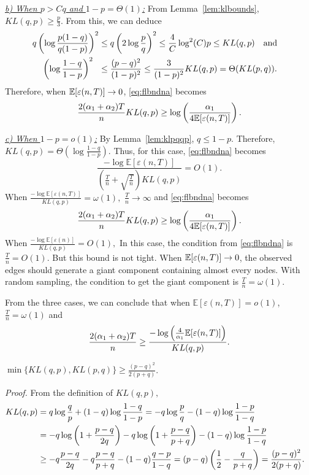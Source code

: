 \smallskip
\noindent\underline{\em \underline b)  When $p >Cq$ and
  $1-p=\Theta(1)$:} From Lemma~\ref{lem:klbounds}, $KL(q,p) \ge
\frac{p}{3}.$ From this, we can deduce
\begin{align}q \left(\log\frac{p(1-q)}{q(1-p)}\right)^2 &\le q \left(2\log\frac{p}{q}\right)^2 \le \frac{4}{C} \log^2(C)
p \le  KL(q,p) \quad \mbox{and} \cr \left( \log\frac{1-q}{1-p}\right)^2 ~~ &\le \frac{(p-q)^2}{(1-p)^2}
\le \frac{3}{(1-p)^2}KL(q,p) = \Theta(KL(p,q) ).\end{align} 
Therefore, when ${\mathbb E}[\varepsilon(n,T)]\rightarrow 0$, \eqref{eq:flbndna} becomes
$$ \frac{2(\alpha_1 + \alpha_2)T}{n}KL(q,p) \ge  \log \left(
  \frac{\alpha_1}{4 {\mathbb E} [ \varepsilon(n,T) ]} \right).$$

\smallskip
\noindent\underline{\em c) When $1-p = o(1)$:} By
Lemma~\ref{lem:klpqqp}, $q \le 1-p$. Therefore, $KL(q,p) = \Theta
(\log\frac{1-q}{1-p}).$ Thus, for this case, \eqref{eq:flbndna} becomes
$$\frac{-\log \mathbb{E}[\varepsilon (n,T)]}{ (\frac{T}{n} +
  \sqrt{\frac{T}{n}} ) KL(q,p)} = O(1). $$
When $\frac{-\log \mathbb{E}[\varepsilon (n,T)]}{ KL(q,p)} = \omega(1),$
$\frac{T}{n} \to \infty$ and \eqref{eq:flbndna} becomes
$$ \frac{2(\alpha_1 + \alpha_2 )T}{n}KL(q,p) \ge  \log \left(
  \frac{\alpha_1}{4 {\mathbb E} [ \varepsilon(n,T) ]} \right).$$
When $\frac{-\log \mathbb{E}[\varepsilon (n)]}{ KL(q,p)} = O(1),$
In this case, the condition from
\eqref{eq:flbndna} is $\frac{T}{n} = O(1).$ But this bound is not
tight. When ${\mathbb E}[\varepsilon(n,T)]\rightarrow 0$, the observed edges should generate a giant component containing almost every nodes. With
random sampling, the condition to get the giant component is $\frac{T}{n} = \omega(1).$

From the three cases, we can conclude that when
$\mathbb{E}[\varepsilon (n,T)] = o(1)$, $\frac{T}{n} = \omega(1)$ and
$$ \frac{2(\alpha_1 + \alpha_2)T}{n} \ge  \frac{-\log \left(\frac{4}{\alpha_1} {\mathbb E} [
    \varepsilon(n,T) ] \right)}{KL(q,p)}.$$

\begin{lemma} $\min \{ KL(q,p), KL(p,q)\} \ge \frac{(p-q)^2}{2(p+q)}$.
\label{lem:klbounds}
\end{lemma}

{\it Proof.} From the definition of $KL(q,p),$
\begin{align*}
KL(q,p)  &=  q \log \frac{q}{p} + (1-q) \log \frac{1-q}{1-p} = -q \log \frac{p}{q} - (1-q) \log \frac{1-p}{1-q} \cr
  &= -q \log\left(1+ \frac{p-q}{2q} \right)-q \log\left(1+ \frac{p-q}{p+q} \right) - (1-q) \log \frac{1-p}{1-q} \cr
 &\ge -q  \frac{p-q}{2q}-q \frac{p-q}{p+q}  - (1-q) \frac{q-p}{1-q} =(p-q)\left(\frac{1}{2} - \frac{q}{p+q} \right)  =  \frac{(p-q)^2}{2(p+q)}.
\end{align*}

